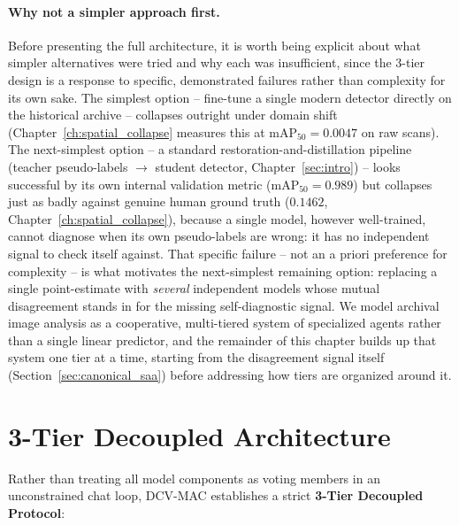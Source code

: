\documentclass[12pt,a4paper]{report}
\begin{document}
\paragraph{Why not a simpler approach first.} Before presenting the full architecture, it is worth being explicit about what simpler alternatives were tried and why each was insufficient, since the 3-tier design is a response to specific, demonstrated failures rather than complexity for its own sake. The simplest option -- fine-tune a single modern detector directly on the historical archive -- collapses outright under domain shift (Chapter~\ref{ch:spatial_collapse} measures this at $\text{mAP}_{50}=0.0047$ on raw scans). The next-simplest option -- a standard restoration-and-distillation pipeline (teacher pseudo-labels $\to$ student detector, Chapter~\ref{sec:intro}) -- looks successful by its own internal validation metric ($\text{mAP}_{50}=0.989$) but collapses just as badly against genuine human ground truth ($0.1462$, Chapter~\ref{ch:spatial_collapse}), because a single model, however well-trained, cannot diagnose when its own pseudo-labels are wrong: it has no independent signal to check itself against. That specific failure -- not an a priori preference for complexity -- is what motivates the next-simplest remaining option: replacing a single point-estimate with \emph{several} independent models whose mutual disagreement stands in for the missing self-diagnostic signal. We model archival image analysis as a cooperative, multi-tiered system of specialized agents rather than a single linear predictor, and the remainder of this chapter builds up that system one tier at a time, starting from the disagreement signal itself (Section~\ref{sec:canonical_saa}) before addressing how tiers are organized around it.

\section{3-Tier Decoupled Architecture}
Rather than treating all model components as voting members in an unconstrained chat loop, DCV-MAC establishes a strict \textbf{3-Tier Decoupled Protocol}:
\end{document}
